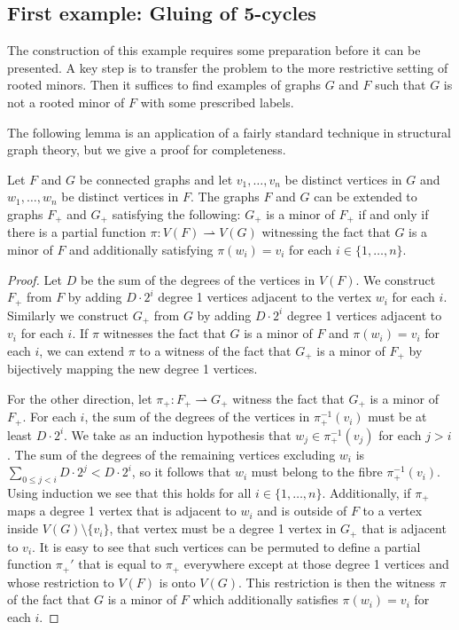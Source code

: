 \documentclass[11pt]{article}
\begin{document}
\subsection{First example: Gluing of 5-cycles}
\label{sec:first-counterexample}
The construction of this example requires some preparation before it can be presented.
A key step is to transfer the problem to the more restrictive setting of rooted minors. Then it suffices to find examples of graphs $G$ and $F$ such that $G$ is not a rooted minor of $F$ with some prescribed labels.
\par 
The following lemma is an application of a fairly standard technique in structural graph theory, but we give a proof for completeness.
\begin{lemma}
\label{lemma:rooted-minors}
    Let $F$ and $G$ be connected graphs and let $v_1,\ldots, v_n$ be distinct vertices in $G$ and $w_1,\ldots, w_n$ be distinct vertices in $F$.
    The graphs $F$ and $G$ can be extended to graphs $F_+$ and $G_+$  satisfying the following: $G_+$ is a minor of $F_+$ if and only if there is a partial function $\pi: V(F) \rightharpoonup V(G)$ witnessing the fact that $G$ is a minor of $F$ and additionally satisfying $\pi(w_i) = v_i$ for each $i \in \{1,\ldots, n\}$.
\end{lemma}
\begin{proof}
    Let $D$ be the sum of the degrees of the vertices in $V(F)$. We construct $F_+$ from $F$ by adding $D\cdot 2^i$ degree 1 vertices adjacent to the vertex $w_i$ for each $i$. Similarly we construct $G_+$ from $G$ by adding $D\cdot 2^i$ degree 1 vertices adjacent to $v_i$ for each $i$.
    If $\pi$ witnesses the fact that $G$ is a minor of $F$ and $\pi(w_i) = v_i$ for each $i$, we can extend $\pi$ to a witness of the fact that $G_+$ is a minor of $F_+$ by bijectively mapping the new degree 1 vertices. 
    \par
    For the other direction, let $\pi_+: F_+ \rightharpoonup G_+$ witness the fact that $G_+$ is a minor of $F_+$. 
    For each $i$, the sum of the degrees of the vertices in $\pi_+^{-1}(v_i)$ must be at least $D\cdot 2^i$. 
    We take as an induction hypothesis that $w_j \in \pi_+^{-1}(v_j)$ for each $j>i$. The sum of the degrees of the remaining vertices excluding $w_i$ is $\sum_{0\leq j<i} D \cdot 2^j < D\cdot 2^i$, so it follows that $w_i$ must belong to the fibre $\pi_+^{-1}(v_i)$. Using induction we see that this holds for all $i\in \{1,\ldots, n\}$.
    Additionally, if $\pi_+$ maps a degree 1 vertex that is adjacent to $w_i$ and is outside of $F$ to a vertex inside $V(G)\setminus \{v_i\}$, that vertex must be a degree 1 vertex in $G_+$ that is adjacent to $v_i$. It is easy to see that such vertices can be permuted to define a partial function $\pi_+'$ that is equal to $\pi_+$ everywhere except at those degree 1 vertices and whose restriction to $V(F)$ is onto $V(G)$. This restriction is then the witness $\pi$ of the fact that $G$ is a minor of $F$ which additionally satisfies $\pi(w_i) = v_i$ for each $i$.
\end{proof}
\end{document}
